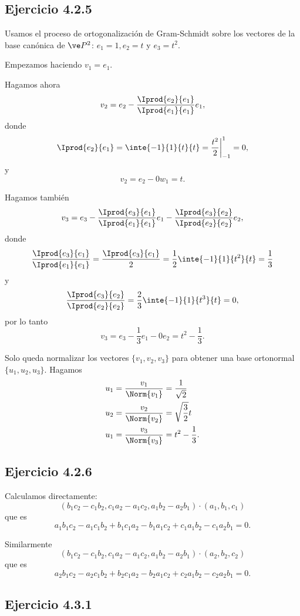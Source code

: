 

	\subsection*{Ejercicio 4.2.5}
	Usamos el proceso de ortogonalización de Gram-Schmidt sobre los vectores de la base canónica de $\ve P^2$: $e_1=1,e_2=t$ y $e_3=t^2$.
	
	Empezamos haciendo $v_1=e_1$.
	
	Hagamos ahora
	\[ 	v_2 = e_2 - \frac{\Iprod{e_2}{e_1}}{\Iprod{e_1}{e_1}} e_1, \]
	donde 
	\[ \Iprod{e_2}{e_1} = \inte{-1}{1}{t}{t} = \frac{t^2}{2}\bigg|^1_{-1} = 0, \]
	y
	\[ v_2 = e_2 - 0w_1 = t. \]
	
	Hagamos también
	\[ v_3 = e_3 - \frac{\Iprod{e_3}{e_1}}{\Iprod{e_1}{e_1}} e_1 - \frac{\Iprod{e_3}{e_2}}{\Iprod{e_2}{e_2}} e_2, \]
	donde 
	\[ \frac{\Iprod{e_3}{e_1}}{\Iprod{e_1}{e_1}} = \frac{\Iprod{e_3}{e_1}}{2} = \frac{1}{2}\inte{-1}{1}{t^2}{t} = \frac{1}{3} \]
	y
	\[ \frac{\Iprod{e_3}{e_2}}{\Iprod{e_2}{e_2}} = \frac{2}{3} \inte{-1}{1}{t^3}{t} = 0, \]
	por lo tanto
	\[ v_3 = e_3 - \frac{1}{3}e_1 - 0e_2 = t^2 - \frac{1}{3}. \]
	
	Solo queda normalizar los vectores $\{v_1,v_2,v_3\}$ para obtener una base ortonormal $\{u_1,u_2,u_3\}$. Hagamos
	\begin{align*}
		u_1 &= \frac{v_1}{\Norm{v_1}} = \frac{1}{\sqrt 2} \\
		u_2 &= \frac{v_2}{\Norm{v_2}} = \sqrt{\frac{3}{2}}t \\
		u_1 &= \frac{v_3}{\Norm{v_3}} = t^2 - \frac{1}{3}.
	\end{align*}
	
	\subsection*{Ejercicio 4.2.6}
	
	Calculamos directamente:
	\[ (b_1c_2-c_1b_2,c_1a_2-a_1c_2,a_1b_2-a_2b_1)\cdot(a_1,b_1,c_1)  \]
	que es
	\[ a_1b_1c_2-a_1c_1b_2+b_1c_1a_2-b_1a_1c_2+c_1a_1b_2-c_1a_2b_1 = 0. \]
	
	Similarmente
	\[ (b_1c_2-c_1b_2,c_1a_2-a_1c_2,a_1b_2-a_2b_1)\cdot(a_2,b_2,c_2)  \]
	que es
	\[ a_2b_1c_2-a_2c_1b_2+b_2c_1a_2-b_2a_1c_2+c_2a_1b_2-c_2a_2b_1 = 0. \]
	
	\subsection*{Ejercicio 4.3.1}
	
